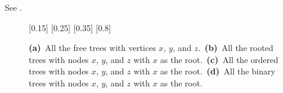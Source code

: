 See .
\begin{figure}[htb]
    \subcaptionbox{\label{fig:B.5-1a}}[0.15\textwidth]{}
    \subcaptionbox{\label{fig:B.5-1b}}[0.25\textwidth]{}
    \subcaptionbox{\label{fig:B.5-1c}}[0.35\textwidth]{}
    \subcaptionbox{\label{fig:B.5-1d}}[0.8\textwidth]{}
    \caption{\textbf{(a)}\, All the free trees with vertices $x$, $y$, and $z$.\,
    \textbf{(b)}\, All the rooted trees with nodes $x$, $y$, and $z$ with $x$ as the root.\,
    \textbf{(c)}\, All the ordered trees with nodes $x$, $y$, and $z$ with $x$ as the root.\,
    \textbf{(d)}\, All the binary trees with nodes $x$, $y$, and $z$ with $x$ as the root.} \label{fig:B.5-1}
\end{figure}
